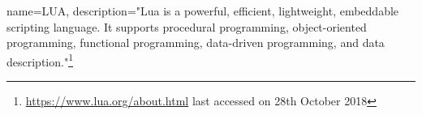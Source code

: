 {
	name={LUA},
	description={"Lua is a powerful, efficient, lightweight, embeddable scripting language. It supports procedural programming, object-oriented programming, functional programming, data-driven programming, and data description."\footnote{\url{https://www.lua.org/about.html} last accessed on 28th October 2018}}
}